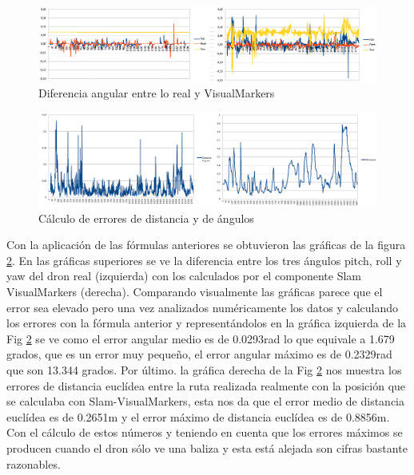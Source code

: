 \begin{figure}[H]
	\begin{center}
		\includegraphics[width=1\textwidth]{imag/IMG90.PNG}
				\caption{Diferencia angular entre lo real y VisualMarkers}
		\label{fig:Error angular.}	
	\end{center}
\end{figure}

\begin{figure}[H]
	\begin{center}
		\includegraphics[width=1\textwidth]{imag/IMG91.PNG}
				\caption{Cálculo de errores de distancia y de ángulos}
		\label{fig:Error de distancia y de giro.}	
	\end{center}
\end{figure}

\hspace{1cm} Con la aplicación de las fórmulas anteriores se obtuvieron las gráficas de la figura \ref{fig:Error de distancia y de giro.}. En las gráficas superiores se ve la diferencia entre los tres ángulos pitch, roll y yaw del dron real (izquierda) con los calculados por el componente Slam VisualMarkers (derecha). Comparando visualmente las gráficas parece que el error sea elevado pero una vez analizados numéricamente los datos y calculando los errores con la fórmula anterior y representándolos en la gráfica izquierda de la Fig \ref{fig:Error de distancia y de giro.} se ve como el error angular medio es de 0.0293rad lo que equivale a 1.679 grados, que es un error muy pequeño, el error angular máximo es de 0.2329rad que son 13.344 grados. Por último. la gráfica derecha de la Fig \ref{fig:Error de distancia y de giro.} nos muestra los errores de distancia euclídea entre la ruta realizada realmente con la posición que se calculaba con Slam-VisualMarkers, esta nos da que el error medio de distancia euclídea es de 0.2651m y el error máximo de distancia euclídea es de 0.8856m. Con el cálculo de estos números y teniendo en cuenta que los errores máximos se producen cuando el dron sólo ve una baliza y esta está alejada son cifras bastante razonables.

